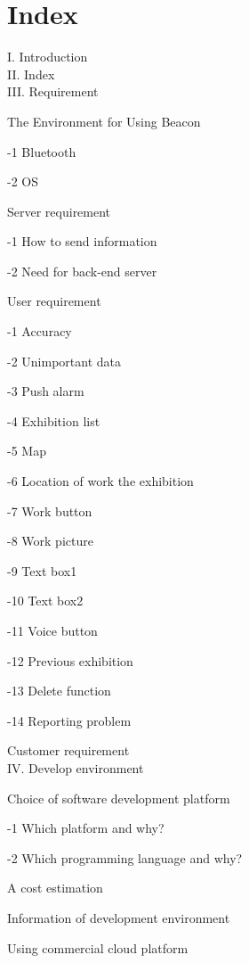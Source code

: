 \documentclass[conference]{IEEEtran}
\begin{document}
\section{Index}

I. Introduction\\

II. Index\\

III. Requirement

 The Environment for Using Beacon

-1 Bluetooth 

-2 OS

 Server requirement

-1 How to send information 

-2 Need for back-end server

 User requirement 

-1 Accuracy

-2 Unimportant data 

-3 Push alarm

-4 Exhibition list

-5 Map

-6 Location of work the exhibition 

-7 Work button

-8 Work picture

-9 Text box1

-10 Text box2

-11 Voice button

-12 Previous exhibition

-13 Delete function

-14 Reporting problem

 Customer requirement\\

IV. Develop environment

 Choice of software development platform

-1 Which platform and why?

-2 Which programming language and why?

 A cost estimation

 Information of development environment

 Using commercial cloud platform\\
\end{document}
